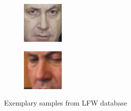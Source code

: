 \begin{figure}[H]
\centering
\begin{subfigure}[b]{.2\linewidth}
\includegraphics[width=\linewidth]{img/tests/lwf/sample1.jpg}
\end{subfigure}
\centering
\begin{subfigure}[b]{.2\linewidth}
\includegraphics[width=\linewidth]{img/tests/lwf/sample2.jpg}
\end{subfigure}
\caption{Exemplary samples from LFW database}
\end{figure}

